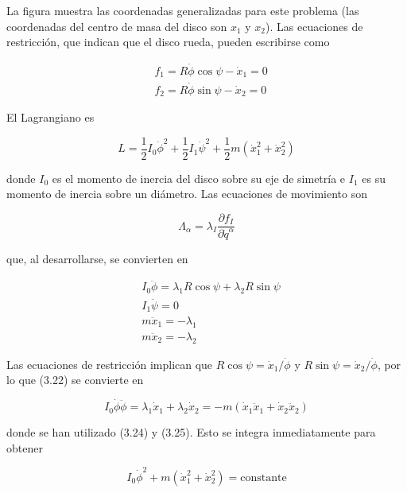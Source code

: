 \begin{example}
  


 La figura muestra las coordenadas generalizadas para este problema (las coordenadas del centro de masa del disco son $x_{1}$ y $x_{2}$). Las ecuaciones de restricción, que indican que el disco rueda, pueden escribirse como

$$
\begin{aligned}
& f_{1}=R \dot{\phi} \cos \psi-\dot{x}_{1}=0 \\
& f_{2}=R \dot{\phi} \sin \psi-\dot{x}_{2}=0
\end{aligned}
$$

El Lagrangiano es

$$
L=\frac{1}{2} I_{0} \dot{\phi}^{2}+\frac{1}{2} I_{1} \dot{\psi}^{2}+\frac{1}{2} m\left(\dot{x}_{1}^{2}+\dot{x}_{2}^{2}\right)
$$

donde $I_{0}$ es el momento de inercia del disco sobre su eje de simetría e $I_{1}$ es su momento de inercia sobre un diámetro. Las ecuaciones de movimiento son

$$
\Lambda_{\alpha}=\lambda_{I} \frac{\partial f_{I}}{\partial \dot{q}^{\alpha}}
$$

que, al desarrollarse, se convierten en

$$
\begin{align*}
& I_{0} \ddot{\phi}=\lambda_{1} R \cos \psi+\lambda_{2} R \sin \psi  \tag{3.22}\\
& I_{1} \ddot{\psi}=0  \tag{3.23}\\
& m \ddot{x}_{1}=-\lambda_{1}  \tag{3.24}\\
& m \ddot{x}_{2}=-\lambda_{2} \tag{3.25}
\end{align*}
$$

Las ecuaciones de restricción implican que $R \cos \psi=\dot{x}_{1} / \dot{\phi}$ y $R \sin \psi=\dot{x}_{2} / \dot{\phi}$, por lo que (3.22) se convierte en

$$
I_{0} \dot{\phi} \ddot{\phi}=\lambda_{1} \dot{x}_{1}+\lambda_{2} \dot{x}_{2}=-m\left(\dot{x}_{1} \ddot{x}_{1}+\dot{x}_{2} \ddot{x}_{2}\right)
$$

donde se han utilizado (3.24) y (3.25). Esto se integra inmediatamente para obtener

$$
I_{0} \dot{\phi}^{2}+m\left(\dot{x}_{1}^{2}+\dot{x}_{2}^{2}\right)=\text{constante}
$$


\end{example}
